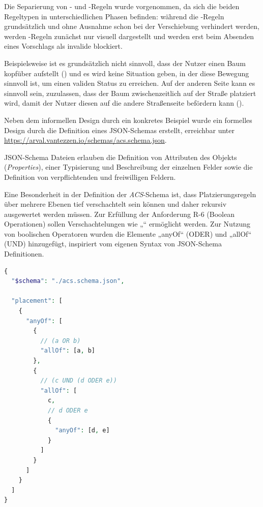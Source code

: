 Die Separierung von - und -Regeln wurde vorgenommen, da sich die beiden Regeltypen in unterschiedlichen Phasen befinden: während die -Regeln grundsätzlich und ohne Ausnahme schon bei der Verschiebung verhindert werden, werden -Regeln zunächst nur visuell dargestellt und werden erst beim Absenden eines Vorschlags als invalide blockiert.

Beispielsweise ist es grundsätzlich nicht sinnvoll, dass der Nutzer einen Baum kopfüber aufstellt () und es wird keine Situation geben, in der diese Bewegung sinnvoll ist, um einen validen Status zu erreichen. Auf der anderen Seite kann es sinnvoll sein, zuzulassen, dass der Baum zwischenzeitlich auf der Straße platziert wird, damit der Nutzer diesen auf die andere Straßenseite befördern kann ().

\medskip

Neben dem informellen Design durch ein konkretes Beispiel wurde ein formelles Design durch die Definition eines JSON-Schemas erstellt, erreichbar unter \url{https://arval.vantezzen.io/schemas/acs.schema.json}.

JSON-Schema Dateien erlauben die Definition von Attributen des Objekts (\textit{Properties}), einer Typisierung und Beschreibung der einzelnen Felder sowie die Definition von verpflichtenden und freiwilligen Feldern.

Eine Besonderheit in der Definition der \textit{ACS}-Schema ist, dass Platzierungsregeln über mehrere Ebenen tief verschachtelt sein können und daher rekursiv ausgewertet werden müssen. Zur Erfüllung der Anforderung R-6 (Boolean Operationen) sollen Verschachtelungen wie „“ ermöglicht werden. Zur Nutzung von boolischen Operatoren wurden die Elemente „anyOf“ (ODER) und „allOf“ (UND) hinzugefügt, inspiriert vom eigenen Syntax von JSON-Schema Definitionen.

\begin{lstlisting}[frame=htrbl, caption={Komplexe Verschachtelungen boolscher Operationen in ACS}, label={lst:acs-recursive}, language=php]
{
  "$schema": "./acs.schema.json",
  
  "placement": [
    {
      "anyOf": [
        {
          // (a OR b)
          "allOf": [a, b]
        },
        {
          // (c UND (d ODER e))
          "allOf": [
            c,
            // d ODER e
            {
              "anyOf": [d, e]
            }
          ]
        }
      ]
    }
  ]
}
\end{lstlisting}

